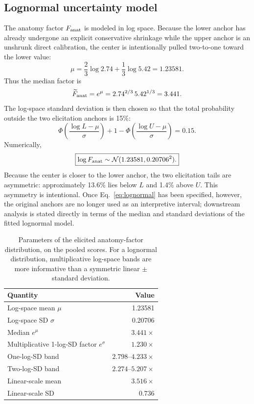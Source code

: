 \documentclass[11pt]{article}
\begin{document}
\subsection{Lognormal uncertainty model}
The anatomy factor $F_{\rm anat}$ is modeled in log space. Because the lower anchor has already undergone an explicit conservative shrinkage while the upper anchor is an unshrunk direct calibration, the center is intentionally pulled two-to-one toward the lower value:
\begin{equation}
\mu=\frac{2}{3}\log 2.74+\frac{1}{3}\log 5.42=1.23581.
\end{equation}
Thus the median factor is
\begin{equation}
\widetilde F_{\rm anat}=e^\mu=2.74^{2/3}\,5.42^{1/3}=3.441.
\end{equation}
The log-space standard deviation is then chosen so that the total probability outside the two elicitation anchors is 15\%:
\begin{equation}
\Phi\!\left(\frac{\log L-\mu}{\sigma}\right)
+1-\Phi\!\left(\frac{\log U-\mu}{\sigma}\right)=0.15.
\end{equation}
Numerically,
\begin{equation}
\boxed{\log F_{\rm anat}\sim\mathcal N(1.23581,0.20706^2).}
\label{eq:lognormal}
\end{equation}
Because the center is closer to the lower anchor, the two elicitation tails are asymmetric: approximately 13.6\% lies below $L$ and 1.4\% above $U$. This asymmetry is intentional. Once Eq.~\eqref{eq:lognormal} has been specified, however, the original anchors are no longer used as an interpretive interval; downstream analysis is stated directly in terms of the median and standard deviations of the fitted lognormal model.

\begin{table}[H]
\centering
\begin{tabular}{lr}
\toprule
Quantity & Value \\
\midrule
Log-space mean $\mu$ & 1.23581 \\
Log-space SD $\sigma$ & 0.20706 \\
Median $e^\mu$ & $3.441\times$ \\
Multiplicative 1-log-SD factor $e^\sigma$ & $1.230\times$ \\
One-log-SD band & $2.798$--$4.233\times$ \\
Two-log-SD band & $2.274$--$5.207\times$ \\
Linear-scale mean & $3.516\times$ \\
Linear-scale SD & $0.736$ \\
\bottomrule
\end{tabular}
\caption{Parameters of the elicited anatomy-factor distribution, on the pooled scores. For a lognormal distribution, multiplicative log-space bands are more informative than a symmetric linear $\pm$ standard deviation.}
\label{tab:dist}
\end{table}
\end{document}
